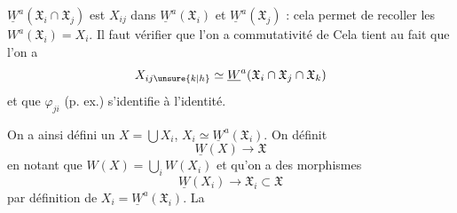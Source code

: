 $\underline W^a(\mathfrak X_i\cap\mathfrak X_j)$ est     $X_{ij}$ dans $\underline W^a(\mathfrak X_i)$ et  $\underline W^a(\mathfrak X_j)$ : cela permet de recoller les $W^a(\mathfrak X_i)=X_i$. Il faut vérifier que l'on a  commutativité de
Cela tient au fait que l'on a
\[
X_{ij\unsure{k|h}}\simeq\underline W^a(\mathfrak X_i\cap\mathfrak X_j\cap\mathfrak X_k)
\]
et que  $\varphi_{ji}$ (p. ex.) s'identifie à l'identité.

On a ainsi défini un $X=\bigcup X_i$, $X_i\simeq\underline W^a(\mathfrak X_i)$. On définit
\[
\underline W(X)\longrightarrow\mathfrak X
\]
en notant que $W(X)=\bigcup_i W(X_i)$  et qu'on a des  morphismes
\[
\underline W(X_i)\longrightarrow\mathfrak X_i\subset\mathfrak X
\]
par définition de $X_i=\underline W^a(\mathfrak X_i)$. La
